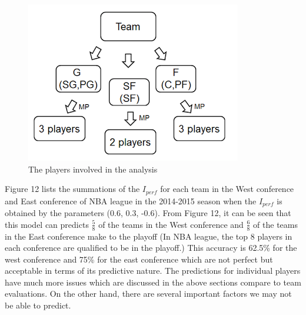 \documentclass{acm_proc_article-sp}
\begin{document}
\begin{figure}[!htb]
\centering
\includegraphics{Fig-11.png}
\caption{The players involved in the analysis}
\end{figure}

Figure 12 lists the summations of the $I_{perf}$ for each team in the West conference and East conference of NBA league in the 2014-2015 season when the $I_{perf}$ is obtained by the parameters (0.6, 0.3, -0.6). From Figure 12, it can be seen that this model can predicts $\frac{5}{8}$ of the teams in the West conference and $\frac{6}{8}$ of the teams in the East conference make to the playoff (In NBA league, the top 8 players in each conference are qualified to be in the playoff.)  This accuracy is 62.5\% for the west conference and 75\% for the east conference which are not perfect but acceptable in terms of its predictive nature. The predictions for individual players have much more issues which are discussed in the above sections compare to team evaluations. On the other hand, there are several important factors we may not be able to predict. 
\end{document}
